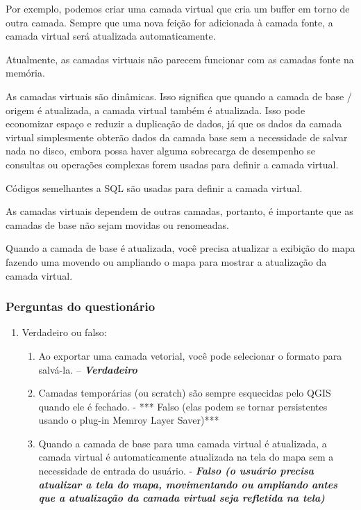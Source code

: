 \documentclass[
  portuguese,
]{krantz}
\providecommand{\tightlist}{%
  \setlength{\itemsep}{0pt}\setlength{\parskip}{0pt}}
\begin{document}
Por exemplo, podemos criar uma camada virtual que cria um buffer em torno de outra camada. Sempre que uma nova feição for adicionada à camada fonte, a camada virtual será atualizada automaticamente.

Atualmente, as camadas virtuais não parecem funcionar com as camadas fonte na memória.

As camadas virtuais são dinâmicas. Isso significa que quando a camada de base / origem é atualizada, a camada virtual também é atualizada. Isso pode economizar espaço e reduzir a duplicação de dados, já que os dados da camada virtual simplesmente obterão dados da camada base sem a necessidade de salvar nada no disco, embora possa haver alguma sobrecarga de desempenho se consultas ou operações complexas forem usadas para definir a camada virtual.

Códigos semelhantes a SQL são usadas para definir a camada virtual.

As camadas virtuais dependem de outras camadas, portanto, é importante que as camadas de base não sejam movidas ou renomeadas.

Quando a camada de base é atualizada, você precisa atualizar a exibição do mapa fazendo uma movendo ou ampliando o mapa para mostrar a atualização da camada virtual.

\hypertarget{perguntas-do-questionuxe1rio-6}{%
\subsubsection{\texorpdfstring{\textbf{Perguntas do questionário}}{Perguntas do questionário}}\label{perguntas-do-questionuxe1rio-6}}

\begin{enumerate}
\def\labelenumi{\arabic{enumi}.}
\item
  Verdadeiro ou falso:

  \begin{enumerate}
  \def\labelenumii{\arabic{enumii}.}
  \tightlist
  \item
    Ao exportar uma camada vetorial, você pode selecionar o formato para salvá-la. -- \textbf{\emph{Verdadeiro}}
  \item
    Camadas temporárias (ou scratch) são sempre esquecidas pelo QGIS quando ele é fechado. - *** Falso (elas podem se tornar persistentes usando o plug-in Memroy Layer Saver)***
  \item
    Quando a camada de base para uma camada virtual é atualizada, a camada virtual é automaticamente atualizada na tela do mapa sem a necessidade de entrada do usuário. - \textbf{\emph{Falso (o usuário precisa atualizar a tela do mapa, movimentando ou ampliando antes que a atualização da camada virtual seja refletida na tela)}}
  \end{enumerate}
\end{enumerate}
\end{document}
